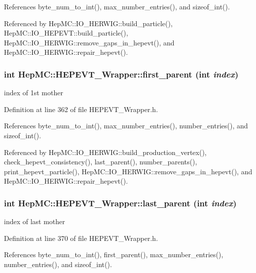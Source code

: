References byte\_\-num\_\-to\_\-int(), max\_\-number\_\-entries(), and sizeof\_\-int().

Referenced by Hep\-MC::IO\_\-HERWIG::build\_\-particle(), Hep\-MC::IO\_\-HEPEVT::build\_\-particle(), Hep\-MC::IO\_\-HERWIG::remove\_\-gaps\_\-in\_\-hepevt(), and Hep\-MC::IO\_\-HERWIG::repair\_\-hepevt().
\subsubsection{\setlength{\rightskip}{0pt plus 5cm}int Hep\-MC::HEPEVT\_\-Wrapper::first\_\-parent (int {\em index})\hspace{0.3cm}{\tt  [inline, static]}}\label{classHepMC_1_1HEPEVT__Wrapper_6d4665dd23fd416ec7f70bdbba1a5fc1}


index of 1st mother 



Definition at line 362 of file HEPEVT\_\-Wrapper.h.

References byte\_\-num\_\-to\_\-int(), max\_\-number\_\-entries(), number\_\-entries(), and sizeof\_\-int().

Referenced by Hep\-MC::IO\_\-HERWIG::build\_\-production\_\-vertex(), check\_\-hepevt\_\-consistency(), last\_\-parent(), number\_\-parents(), print\_\-hepevt\_\-particle(), Hep\-MC::IO\_\-HERWIG::remove\_\-gaps\_\-in\_\-hepevt(), and Hep\-MC::IO\_\-HERWIG::repair\_\-hepevt().
\subsubsection{\setlength{\rightskip}{0pt plus 5cm}int Hep\-MC::HEPEVT\_\-Wrapper::last\_\-parent (int {\em index})\hspace{0.3cm}{\tt  [inline, static]}}\label{classHepMC_1_1HEPEVT__Wrapper_bffc1f6aa474d1a7f4822142cb82df41}


index of last mother 



Definition at line 370 of file HEPEVT\_\-Wrapper.h.

References byte\_\-num\_\-to\_\-int(), first\_\-parent(), max\_\-number\_\-entries(), number\_\-entries(), and sizeof\_\-int().

